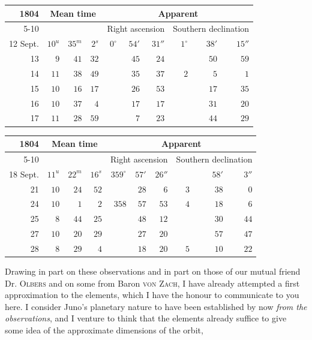\begin{center}
\begingroup\fontsize{10}{12}\selectfont\setlength{\tabcolsep}{3pt}\renewcommand{\arraystretch}{1.12}
\begin{tabular}{r|rrr|rrr|rrr}
1804 & \multicolumn{3}{c|}{Mean time} & \multicolumn{6}{c}{Apparent} \\ \cline{5-10}
 & \multicolumn{3}{c|}{} & \multicolumn{3}{c|}{Right ascension} & \multicolumn{3}{c}{Southern declination} \\ \hline
12 Sept. & $10^u$ & $35^m$ & $2^s$ & $0^\circ$ & $54'$ & $31''$ & $1^\circ$ & $38'$ & $15''$ \\
13 & $9$ & $41$ & $32$ &  & $45$ & $24$ &  & $50$ & $59$ \\
14 & $11$ & $38$ & $49$ &  & $35$ & $37$ & $2$ & $5$ & $1$ \\
15 & $10$ & $16$ & $17$ &  & $26$ & $53$ &  & $17$ & $35$ \\
16 & $10$ & $37$ & $4$ &  & $17$ & $17$ &  & $31$ & $20$ \\
17 & $11$ & $28$ & $59$ &  & $7$ & $23$ &  & $44$ & $29$ \\
\end{tabular}\endgroup
\end{center}
\begin{center}
\begingroup\fontsize{10}{12}\selectfont\setlength{\tabcolsep}{3pt}\renewcommand{\arraystretch}{1.12}
\begin{tabular}{r|rrr|rrr|rrr}
1804 & \multicolumn{3}{c|}{Mean time} & \multicolumn{6}{c}{Apparent} \\ \cline{5-10}
 & \multicolumn{3}{c|}{} & \multicolumn{3}{c|}{Right ascension} & \multicolumn{3}{c}{Southern declination} \\ \hline
18 Sept. & $11^u$ & $22^m$ & $16^s$ & $359^\circ$ & $57'$ & $26''$ &  & $58'$ & $3''$ \\
21 & $10$ & $24$ & $52$ &  & $28$ & $6$ & $3$ & $38$ & $0$ \\
24 & $10$ & $1$ & $2$ & $358$ & $57$ & $53$ & $4$ & $18$ & $6$ \\
25 & $8$ & $44$ & $25$ &  & $48$ & $12$ &  & $30$ & $44$ \\
27 & $10$ & $20$ & $29$ &  & $27$ & $20$ &  & $57$ & $47$ \\
28 & $8$ & $29$ & $4$ &  & $18$ & $20$ & $5$ & $10$ & $22$ \\
\end{tabular}\endgroup
\end{center}
%

Drawing in part on these observations and in part on those of our mutual friend Dr. \textsc{Olbers} and on some from Baron \textsc{von Zach}, I have already attempted a first approximation to the elements, which I have the honour to communicate to you here. I consider Juno’s planetary nature to have been established by now \emph{from the observations}, and I venture to think that the elements already suffice to give some idea of the approximate dimensions of the orbit,

